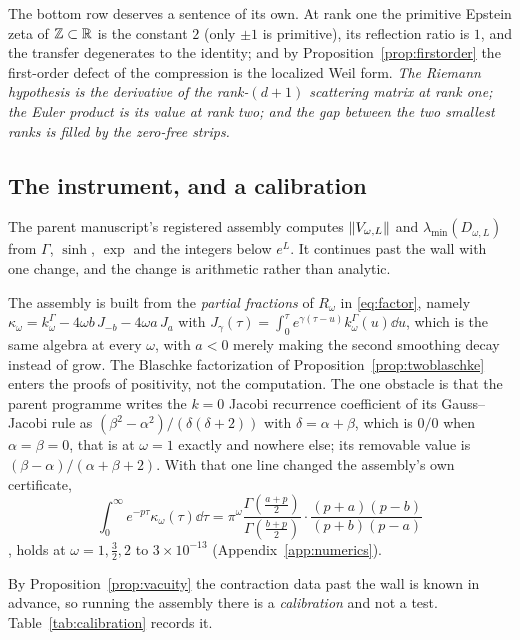 The bottom row deserves a sentence of its own. At rank one the primitive Epstein
zeta of $\mathbb Z\subset\mathbb R$ is the constant $2$ (only $\pm1$ is primitive), its
reflection ratio is $1$, and the transfer degenerates to the identity; and by
Proposition~\ref{prop:firstorder} the first-order defect of the compression is
the localized Weil form. \emph{The Riemann hypothesis is the derivative of the
rank-$(d{+}1)$ scattering matrix at rank one; the Euler product is its value at
rank two; and the gap between the two smallest ranks is filled by the zero-free
strips.}

\subsection{The instrument, and a calibration}\label{sec:calibration}

The parent manuscript's registered assembly \cite[Sec.~5]{Markov} computes
$\lVert V_{\omega,L}\rVert$ and $\lambda_{\min}(D_{\omega,L})$ from $\Gamma$, $\sinh$,
$\exp$ and the integers below $e^L$. It continues past the wall with one change,
and the change is arithmetic rather than analytic.

\begin{remark}\label{rem:assembly}
The assembly is built from the \emph{partial fractions} of $R_\omega$ in
\eqref{eq:factor}, namely
$\kappa_\omega=k^\Gamma_\omega-4\omega b\,J_{-b}-4\omega a\,J_{a}$ with
$J_\gamma(\tau)=\int_0^\tau e^{\gamma(\tau-u)}k^\Gamma_\omega(u)\dd u$, which is
the same algebra at every $\omega$, with $a<0$ merely making the second smoothing
decay instead of grow. The Blaschke factorization of
Proposition~\ref{prop:twoblaschke} enters the proofs of positivity, not the
computation. The one obstacle is that the parent programme writes the $k=0$
Jacobi recurrence coefficient of its Gauss--Jacobi rule as
$(\beta^2-\alpha^2)/(\delta(\delta+2))$ with $\delta=\alpha+\beta$, which is
$0/0$ when $\alpha=\beta=0$, that is at $\omega=1$ exactly and nowhere else; its
removable value is $(\beta-\alpha)/(\alpha+\beta+2)$. With that one line changed
the assembly's own certificate,
\[
 \int_0^\infty e^{-p\tau}\kappa_\omega(\tau)\dd\tau
 =\pi^\omega\frac{\Gamma(\frac{a+p}2)}{\Gamma(\frac{b+p}2)}\cdot
 \frac{(p+a)(p-b)}{(p+b)(p-a)}
\]
\cite[Prop.~5.3]{Markov}, holds at $\omega=1,\frac32,2$ to $3\times10^{-13}$
(Appendix~\ref{app:numerics}).
\end{remark}

By Proposition~\ref{prop:vacuity} the contraction data past the wall is known in
advance, so running the assembly there is a \emph{calibration} and not a test.
Table~\ref{tab:calibration} records it.

